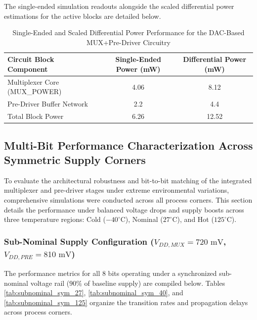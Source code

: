 The single-ended simulation readouts alongside the scaled differential power estimations for the active blocks are detailed below.

\begin{table}[H]
    \centering
    \renewcommand{\arraystretch}{1.3}
    \setlength{\tabcolsep}{11pt}
    \begin{tabular}{|l|c|c|}
        \hline
        Circuit Block Component & Single-Ended Power (mW) & Differential Power (mW) \\ \hline
        Multiplexer Core (MUX\_POWER) & 4.06 & 8.12 \\ \hline
        Pre-Driver Buffer Network & 2.2 & 4.4 \\ \hline
        Total Block Power & 6.26 & 12.52 \\ \hline
    \end{tabular}
    \vspace{2mm}
    \caption{Single-Ended and Scaled Differential Power Performance for the DAC-Based MUX+Pre-Driver Circuitry}
    \label{tab:power_metrics}
\end{table}
\clearpage

\subsection{Multi-Bit Performance Characterization Across Symmetric Supply Corners}
\label{subsec:symmetric_supply_multibit_corners}

To evaluate the architectural robustness and bit-to-bit matching of the integrated multiplexer and pre-driver stages under extreme environmental variations, comprehensive simulations were conducted across all process corners. This section details the performance under balanced voltage drops and supply boosts across three temperature regions: Cold ($-40^\circ\text{C}$), Nominal ($27^\circ\text{C}$), and Hot ($125^\circ\text{C}$).

\subsubsection*{ Sub-Nominal Supply Configuration ($V_{DD,MUX} = 720\text{ mV}$, $V_{DD,PRE} = 810\text{ mV}$)}

The performance metrics for all 8 bits operating under a synchronized sub-nominal voltage rail ($90\%$ of baseline supply) are compiled below. Tables \ref{tab:subnominal_sym_27}, \ref{tab:subnominal_sym_40}, and \ref{tab:subnominal_sym_125} organize the transition rates and propagation delays across process corners.

